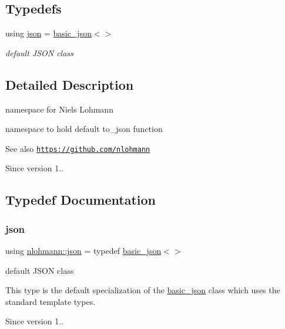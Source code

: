 \subsection*{Typedefs}
\begin{DoxyCompactItemize}
\item 
using \hyperlink{namespacenlohmann_a2bfd99e845a2e5cd90aeaf1b1431f474}{json} = \hyperlink{classnlohmann_1_1basic__json}{basic\+\_\+json}$<$$>$
\begin{DoxyCompactList}\small\item\em default J\+S\+ON class \end{DoxyCompactList}\end{DoxyCompactItemize}


\subsection{Detailed Description}
namespace for Niels Lohmann 

namespace to hold default {\ttfamily to\+\_\+json} function

\begin{DoxySeeAlso}{See also}
\href{https://github.com/nlohmann}{\tt https\+://github.\+com/nlohmann} 
\end{DoxySeeAlso}
\begin{DoxySince}{Since}
version 1.. 
\end{DoxySince}


\subsection{Typedef Documentation}
\mbox{\label{namespacenlohmann_a2bfd99e845a2e5cd90aeaf1b1431f474}} 
\subsubsection{\texorpdfstring{json}{json}}
{\footnotesize\ttfamily using \hyperlink{namespacenlohmann_a2bfd99e845a2e5cd90aeaf1b1431f474}{nlohmann\+::json} = typedef \hyperlink{classnlohmann_1_1basic__json}{basic\+\_\+json}$<$$>$}



default J\+S\+ON class 

This type is the default specialization of the \hyperlink{classnlohmann_1_1basic__json}{basic\+\_\+json} class which uses the standard template types.

\begin{DoxySince}{Since}
version 1.. 
\end{DoxySince}

